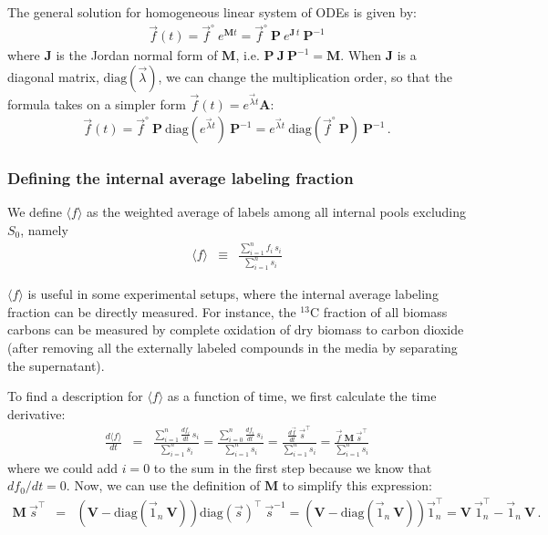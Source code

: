 \documentclass{article}
\newcommand{\finit}{\ensuremath{\vec{f}^\circ}}
\newcommand{\fin}{\ensuremath{\langle f \rangle}}
\begin{document}
The general solution for homogeneous linear system of ODEs is given by:
\begin{eqnarray}
    \vec{f}(t) = \finit~e^{\mathbf{M} t} =  \finit~\mathbf{P}~e^{\mathbf{J}\,t}~\mathbf{P}^{-1}
\end{eqnarray}
where $\mathbf{J}$ is the Jordan normal form of $\mathbf{M}$, i.e. $\mathbf{P}~\mathbf{J}~\mathbf{P}^{-1} = \mathbf{M}$. When $\mathbf{J}$ is a diagonal matrix, $\text{diag}(\vec{\lambda})$, we can change the multiplication order, so that the formula takes on a simpler form $\vec{f}(t) = e^{\vec{\lambda} t}\mathbf{A}$:
\begin{eqnarray}\label{eq:homogenous_solution}
    \vec{f}(t) =
    \finit~\mathbf{P} ~ \text{diag}\left(e^{\vec{\lambda} t}\right) ~ \mathbf{P}^{-1} =
    e^{\vec{\lambda} t} ~ \text{diag}\left(\finit~\mathbf{P}\right) ~ \mathbf{P}^{-1}\,.
\end{eqnarray}

\subsubsection{Defining the internal average labeling fraction}

We define $\fin$ as the weighted average of labels among all internal pools excluding $S_0$, namely 
\begin{eqnarray}
\fin &\equiv& \frac{\sum_{i=1}^{n} f_i \, s_i}{\sum_{i=1}^{n} s_i}
\end{eqnarray}

$\fin$ is useful in some experimental setups, where the internal average labeling fraction can be directly measured. For instance, the $^{13}$C fraction of all biomass carbons can be measured by complete oxidation of dry biomass to carbon dioxide (after removing all the externally labeled compounds in the media by separating the supernatant).

To find a description for $\fin$ as a function of time, we first calculate the time derivative:
\begin{eqnarray}
\frac{d\fin}{dt} &=& \frac{\sum_{i=1}^{n} \frac{d f_i}{dt} \, s_i}{\sum_{i=1}^{n} s_i} = \frac{\sum_{i=0}^{n} \frac{d f_i}{dt} \, s_i}{\sum_{i=1}^{n} s_i} = \frac{\frac{d\vec{f}}{dt}~ \vec{s}^\top}{\sum_{i=1}^{n} s_i} = \frac{\vec{f}~\mathbf{M}~\vec{s}^\top}{\sum_{i=1}^{n} s_i}
\end{eqnarray}
where we could add $i = 0$ to the sum in the first step because we know that $df_0 / dt = 0$. Now, we can use the definition of $\mathbf{M}$ to simplify this expression:
\begin{eqnarray}
	\mathbf{M}~\vec{s}^\top &=& \left(\mathbf{V} - \text{diag}(\vec{1}_n~\mathbf{V})\right) \text{diag}(\vec{s})^\top~\vec{s}^{-1}
	= \left(\mathbf{V} - \text{diag}(\vec{1}_n~\mathbf{V})\right) \vec{1}_n^\top 
	= \mathbf{V}~\vec{1}_n^\top - \vec{1}_n~\mathbf{V}\,.
\end{eqnarray}
\end{document}
